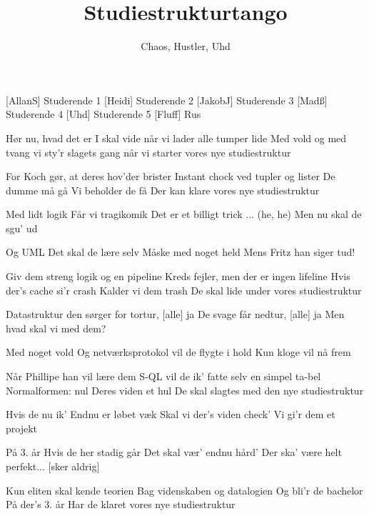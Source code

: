 \documentclass[a4paper,11pt]{article}
\title{Studiestrukturtango}
\author{Chaos, Hustler, Uhd}
\begin{document}
\maketitle

\begin{roles}
[AllanS] Studerende 1
[Heidi] Studerende 2
[JakobJ] Studerende 3
[Madß] Studerende 4
[Uhd] Studerende 5
[Fluff] Rus
\end{roles}

\begin{props}
\end{props}



\begin{song}
 Hør nu, hvad det er I skal vide
når vi lader alle tumper lide
Med vold og med tvang
vi sty'r slagets gang
 når vi starter vores nye studiestruktur  

 For Koch gør, at deres hov'der brister
Instant chock ved tupler og lister
De dumme må gå
Vi beholder de få
 Der kan klare vores nye studiestruktur

 Med lidt logik
Får vi tragikomik
Det er et billigt trick ... (he, he)
Men nu skal de sgu' ud

 Og UML
Det skal de lære selv
 Måske med noget held
 Mens Fritz han siger tud!

 Giv dem streng logik og en pipeline
Kreds fejler, men der er ingen lifeline
Hvis der's cache si'r crash
Kalder vi dem trash
De skal lide under vores studiestruktur

 Datastruktur
den sørger for tortur, [alle] ja
De svage får nedtur, [alle] ja
 Men hvad skal vi med dem?

 Med noget vold
Og netværksprotokol
vil de flygte i hold
Kun kloge vil nå frem

 Når Phillipe han vil lære dem S-QL
vil de ik' fatte selv en simpel ta-bel 
Normalformen: nul
Deres viden et hul
De skal slagtes med den nye studiestruktur

 Hvis de nu ik'
Endnu er løbet væk
Skal vi der's viden check'
Vi gi'r dem et projekt

På 3. år
Hvis de her stadig går
Det skal vær' endnu hård'
Der ska' være helt perfekt... [sker aldrig]

Kun eliten skal kende teorien
Bag videnskaben og datalogien
Og bli'r de bachelor
På der's 3. år
Har de klaret vores nye studiestruktur

\end{song}
\end{document}
